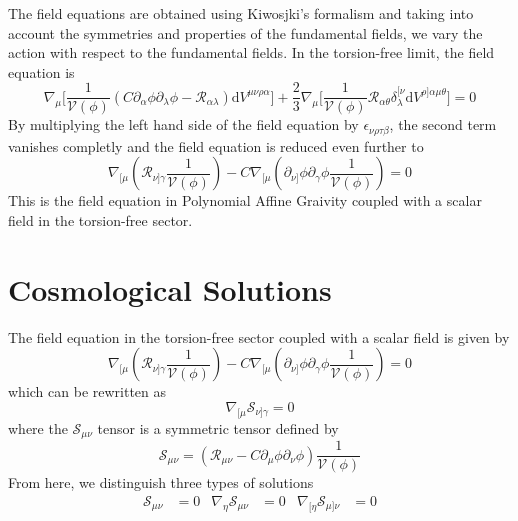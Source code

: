 \documentclass[10pt,a4paper]{article}
\begin{document}
The field equations are obtained using Kiwosjki's formalism and taking into account the symmetries and properties of the fundamental fields, we 
vary the action with respect to the fundamental fields. In the torsion-free limit, the field equation is
\begin{equation}
  \nabla_\mu \biggl[\frac{1}{\mathcal{V}(\phi)} \left(C \partial_\alpha \phi \partial_\lambda \phi - \mathcal{R}_{\alpha\lambda}\right)\mathrm{d}V^{\mu\nu\rho\alpha}\biggr] 
  + \frac{2}{3}\nabla_\mu \biggl[ \frac{1}{\mathcal{V}(\phi)}\mathcal{R}_{\alpha\theta} \delta^{[\nu}_{\lambda}\mathrm{d}V^{\rho]\alpha\mu\theta} \biggr] = 0
\end{equation}
By multiplying the left hand side of the field equation by $\epsilon_{\nu\rho\tau\beta}$, the second term vanishes completly and the field 
equation is reduced even further to
\begin{equation}
  \nabla_{[\mu}\left(\mathcal{R}_{\nu]\gamma}\frac{1}{\mathcal{V}(\phi)}\right) 
  - C \nabla_{[\mu}\left(\partial_{\nu]} \phi \partial_\gamma \phi \frac{1}{\mathcal{V}(\phi)}\right) = 0
\end{equation}
This is the field equation in Polynomial Affine Graivity coupled with a scalar field in the torsion-free sector.




\section{Cosmological Solutions}

The field equation in the torsion-free sector coupled with a scalar field is given by
\begin{equation}
  \nabla_{[\mu}\left(\mathcal{R}_{\nu]\gamma}\frac{1}{\mathcal{V}(\phi)}\right) 
  - C \nabla_{[\mu}\left(\partial_{\nu]} \phi \partial_\gamma \phi \frac{1}{\mathcal{V}(\phi)}\right) = 0
\end{equation}
which can be rewritten as
\begin{equation}
  \nabla_{[\mu}\mathcal{S}_{\nu]\gamma} = 0
\end{equation}
where the $\mathcal{S}_{\mu\nu}$ tensor is a symmetric tensor defined by
\begin{equation}
  \mathcal{S}_{\mu\nu} = \left(\mathcal{R}_{\mu\nu} - C \partial_{\mu} \phi \partial_\nu \phi \right)\frac{1}{\mathcal{V}(\phi)}
\end{equation}
From here, we distinguish three types of solutions
\begin{align}
  \mathcal{S}_{\mu\nu} & = 0 & \nabla_{\eta} \mathcal{S}_{\mu\nu} & = 0 & \nabla_{[\eta} \mathcal{S}_{\mu]\nu} & = 0
\end{align}
\end{document}

